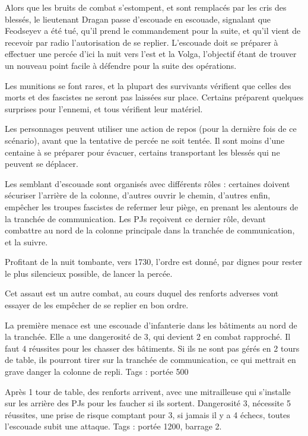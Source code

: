 \documentclass{report}
\begin{document}
\begin{multicols}{2}
Alors que les bruits de combat s'estompent, et sont remplacés par les cris des blessés, le lieutenant Dragan passe d'escouade en escouade, signalant que Feodseyev a été tué, qu'il prend le commandement pour la suite, et qu'il vient de recevoir par radio l'autorisation de se replier. L'escouade doit se préparer à effectuer une percée d'ici la nuit vers l'est et la Volga, l'objectif étant de trouver un nouveau point facile à défendre pour la suite des opérations.

Les munitions se font rares, et la plupart des survivants vérifient que celles des morts et des fascistes ne seront pas laissées sur place. Certains préparent quelques surprises pour l'ennemi, et tous vérifient leur matériel.

Les personnages peuvent utiliser une action de repos (pour la dernière fois de ce scénario), avant que la tentative de percée ne soit tentée. Il sont moins d'une centaine à se préparer pour évacuer, certains transportant les blessés qui ne peuvent se déplacer.


Les semblant d'escouade sont organisés avec différents rôles : certaines doivent sécuriser l'arrière de la colonne, d'autres ouvrir le chemin, d'autres enfin, empêcher les troupes fascistes de refermer leur piège, en prenant les alentours de la tranchée de communication. Les PJs reçoivent ce dernier rôle, devant combattre au nord de la colonne principale dans la tranchée de communication, et la suivre.

Profitant de la nuit tombante, vers 1730, l'ordre est donné, par dignes pour rester le plus silencieux possible, de lancer la percée. 

Cet assaut est un autre combat, au cours duquel des renforts adverses vont essayer de les empêcher de se replier en bon ordre.

La première menace est une escouade d'infanterie dans les bâtiments au nord de la tranchée. Elle a une dangerosité de 3, qui devient 2 en combat rapproché. Il faut 4 réussites pour les chasser des bâtiments. Si ils ne sont pas gérés en 2 tours de table, ils pourront tirer sur la tranchée de communication, ce qui mettrait en grave danger la colonne de repli. Tags : portée 500

Après 1 tour de table, des renforts arrivent, avec une mitrailleuse qui s'installe sur les arrière des PJs pour les faucher si ils sortent. Dangerosité 3, nécessite 5 réussites, une prise de risque comptant pour 3, si jamais il y a 4 échecs, toutes l'escouade subit une attaque. Tags : portée 1200, barrage 2.


\end{multicols}
\end{document}
